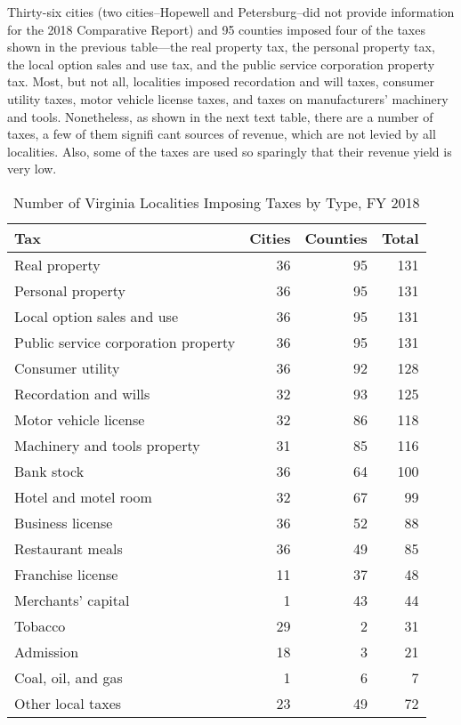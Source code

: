 \documentclass[
]{book}
\begin{document}
Thirty-six cities (two cities--Hopewell and Petersburg--did not provide information for the 2018 Comparative Report) and 95 counties imposed four of the taxes shown in the previous table---the real property tax, the personal property tax, the local option sales and use tax, and the public service corporation property tax. Most, but not all, localities imposed recordation and will taxes, consumer utility taxes, motor vehicle license taxes, and taxes on manufacturers' machinery and tools. Nonetheless, as shown in the next text table, there are a number of taxes, a few of them signifi cant sources of revenue, which are not levied by all localities. Also, some of the taxes are used so sparingly that their revenue yield is very low.

\begin{table}

\caption{\label{tab:unnamed-chunk-3}Number of Virginia Localities Imposing Taxes by Type, FY 2018}
\centering
\begin{tabular}[t]{l|r|r|r}
\hline
Tax & Cities & Counties & Total\\
\hline
Real property & 36 & 95 & 131\\
\hline
Personal property & 36 & 95 & 131\\
\hline
Local option sales and use & 36 & 95 & 131\\
\hline
Public service corporation property & 36 & 95 & 131\\
\hline
Consumer utility & 36 & 92 & 128\\
\hline
Recordation and wills & 32 & 93 & 125\\
\hline
Motor vehicle license & 32 & 86 & 118\\
\hline
Machinery and tools property & 31 & 85 & 116\\
\hline
Bank stock & 36 & 64 & 100\\
\hline
Hotel and motel room & 32 & 67 & 99\\
\hline
Business license & 36 & 52 & 88\\
\hline
Restaurant meals & 36 & 49 & 85\\
\hline
Franchise license & 11 & 37 & 48\\
\hline
Merchants’ capital & 1 & 43 & 44\\
\hline
Tobacco & 29 & 2 & 31\\
\hline
Admission & 18 & 3 & 21\\
\hline
Coal, oil, and gas & 1 & 6 & 7\\
\hline
Other local taxes & 23 & 49 & 72\\
\hline
\end{tabular}
\end{table}
\end{document}
